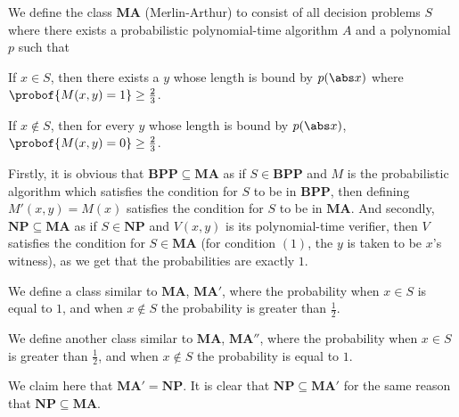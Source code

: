 \documentclass[10pt]{article}
\def\NP{\mathbf{NP}}
\def\BPP{\mathbf{BPP}}
\begin{document}


\bigskip

\def\MA{\mathbf{MA}}
\begin{defn*}

    We define the class $\MA$ (Merlin-Arthur) to consist of all decision problems $S$ where there exists a probabilistic polynomial-time algorithm $A$ and a polynomial $p$ such that
    \benum
        \item If $x\in S$, then there exists a $y$ whose length is bound by $p(\abs x)$ where $\probof{M(x,y)=1}\geq\frac23$.
        \item If $x\notin S$, then for every $y$ whose length is bound by $p(\abs x)$, $\probof{M(x,y)=0}\geq\frac23$.
    \eenum

\end{defn*}

Firstly, it is obvious that $\BPP\subseteq\MA$ as if $S\in\BPP$ and $M$ is the probabilistic algorithm which satisfies the condition for $S$ to be in $\BPP$, then defining $M'(x,y)=M(x)$ satisfies the
condition for $S$ to be in $\MA$.
And secondly, $\NP\subseteq\MA$ as if $S\in\NP$ and $V(x,y)$ is its polynomial-time verifier, then $V$ satisfies the condition for $S\in\MA$ (for condition $(1)$, the $y$ is taken to be $x$'s witness), as
we get that the probabilities are exactly $1$.

\begin{exercise*}

    \benum
        \item We define a class similar to $\MA$, $\MA'$, where the probability when $x\in S$ is equal to $1$, and when $x\notin S$ the probability is greater than $\frac12$.
        \item We define another class similar to $\MA$, $\MA''$, where the probability when $x\in S$ is greater than $\frac12$, and when $x\notin S$ the probability is equal to $1$.
    \eenum

\end{exercise*}

\benum
    \item We claim here that $\MA'=\NP$.
    It is clear that $\NP\subseteq\MA'$ for the same reason that $\NP\subseteq\MA$.
\end{document}
